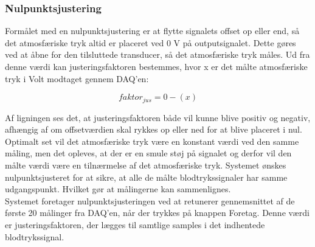 \subsubsection{Nulpunktsjustering}
Formålet med en nulpunktsjustering er at flytte signalets offset op eller end, så det atmosfæriske tryk altid er placeret ved 0 V på outputsignalet. Dette gøres ved at åbne for den tilsluttede transducer, så det atmosfæriske tryk måles. Ud fra denne værdi kan justeringsfaktoren bestemmes, hvor x er det målte atmosfæriske tryk i Volt modtaget gennem DAQ’en:
\begin{ceqn}
\begin{equation}
faktor_{jus}=0-(x)
\end{equation}
\end{ceqn}
Af ligningen ses det, at justeringsfaktoren både vil kunne blive positiv og negativ, afhængig af om offsetværdien skal rykkes op eller ned for at blive placeret i nul. Optimalt set vil det atmosfæriske tryk være en konstant værdi ved den samme måling, men det opleves, at der er en smule støj på signalet og derfor vil den målte værdi være en tilnærmelse af det atmosfæriske tryk. Systemet ønskes nulpunktsjusteret for at sikre, at alle de målte blodtrykssignaler har samme udgangspunkt. Hvilket gør at målingerne kan sammenlignes.\\
Systemet foretager nulpunktsjusteringen ved at retunerer gennemsnittet af de første 20 målinger fra DAQ'en, når der trykkes på knappen Foretag. Denne værdi er justeringsfaktoren, der lægges til samtlige samples i det indhentede blodtrykssignal.

